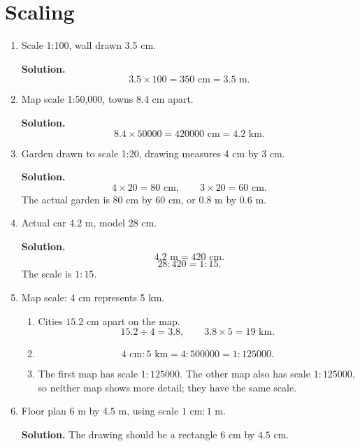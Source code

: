 \documentclass[12pt,a4paper]{article}
\begin{document}
\section*{Scaling}
\begin{enumerate}
\item Scale 1:100, wall drawn 3.5 cm.

\textbf{Solution.}
\[
3.5\times100=350\text{ cm}=3.5\text{ m}.
\]

\item Map scale 1:50,000, towns 8.4 cm apart.

\textbf{Solution.}
\[
8.4\times50000=420000\text{ cm}=4.2\text{ km}.
\]

\item Garden drawn to scale 1:20, drawing measures 4 cm by 3 cm.

\textbf{Solution.}
\[
4\times20=80\text{ cm},\qquad 3\times20=60\text{ cm}.
\]
The actual garden is \(80\) cm by \(60\) cm, or \(0.8\) m by \(0.6\) m.

\item Actual car \(4.2\) m, model \(28\) cm.

\textbf{Solution.}
\[
4.2\text{ m}=420\text{ cm}.
\]
\[
28:420=1:15.
\]
The scale is \(1:15\).

\item Map scale: 4 cm represents 5 km.

\begin{enumerate}[label=(\alph*)]
\item Cities \(15.2\) cm apart on the map.
\[
15.2\div4=3.8,\qquad 3.8\times5=19\text{ km}.
\]

\item
\[
4\text{ cm}:5\text{ km}=4:500000=1:125000.
\]

\item The first map has scale \(1:125000\). The other map also has scale \(1:125000\), so neither map shows more detail; they have the same scale.
\end{enumerate}

\item Floor plan \(6\) m by \(4.5\) m, using scale \(1\text{ cm}:1\text{ m}\).

\textbf{Solution.} The drawing should be a rectangle \(6\) cm by \(4.5\) cm.

\begin{center}
\end{center}
\end{enumerate}
\end{document}

